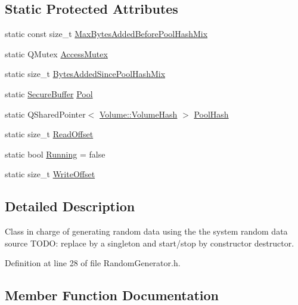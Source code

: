 \subsection*{Static Protected Attributes}
\begin{DoxyCompactItemize}
\item 
static const size\+\_\+t \hyperlink{class_gost_crypt_1_1_core_1_1_random_generator_a83367f01390fdfcb9d7305b51bd7072e}{Max\+Bytes\+Added\+Before\+Pool\+Hash\+Mix}
\item 
static Q\+Mutex \hyperlink{class_gost_crypt_1_1_core_1_1_random_generator_a3b960e276735f7294e5534166ecb9897}{Access\+Mutex}
\item 
static size\+\_\+t \hyperlink{class_gost_crypt_1_1_core_1_1_random_generator_a652145b6af2dbe791de3df91777824e4}{Bytes\+Added\+Since\+Pool\+Hash\+Mix}
\item 
static \hyperlink{class_gost_crypt_1_1_secure_buffer}{Secure\+Buffer} \hyperlink{class_gost_crypt_1_1_core_1_1_random_generator_accde03e05baae45fafe00e4707294e8e}{Pool}
\item 
static Q\+Shared\+Pointer$<$ \hyperlink{class_gost_crypt_1_1_volume_1_1_volume_hash}{Volume\+::\+Volume\+Hash} $>$ \hyperlink{class_gost_crypt_1_1_core_1_1_random_generator_ab9eeae07912df145f02a9678365d2675}{Pool\+Hash}
\item 
static size\+\_\+t \hyperlink{class_gost_crypt_1_1_core_1_1_random_generator_ad5ea3444e1ea8b350e9d344bbdc393bf}{Read\+Offset}
\item 
static bool \hyperlink{class_gost_crypt_1_1_core_1_1_random_generator_ac4809c78682ef865d9cf9254c46ba916}{Running} = false
\item 
static size\+\_\+t \hyperlink{class_gost_crypt_1_1_core_1_1_random_generator_a15b95fab71d2b507bf6d7bd6d09fec8b}{Write\+Offset}
\end{DoxyCompactItemize}


\subsection{Detailed Description}
Class in charge of generating random data using the the system random data source T\+O\+DO\+: replace by a singleton and start/stop by constructor destructor. 

Definition at line 28 of file Random\+Generator.\+h.



\subsection{Member Function Documentation}
\mbox{\label{class_gost_crypt_1_1_core_1_1_random_generator_a224d4fbb985a936d542592764722336f}} 
